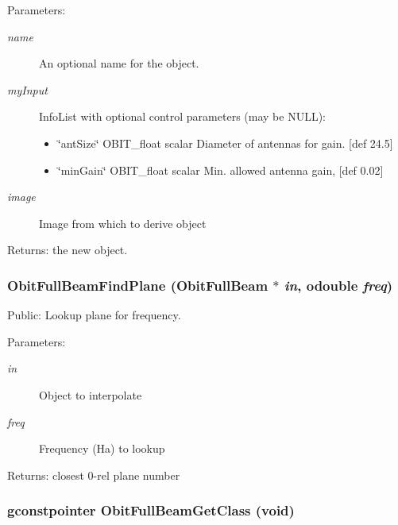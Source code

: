 \begin{Desc}
\item[Parameters:]
\begin{description}
\item[{\em name}]An optional name for the object. \item[{\em my\-Input}]Info\-List with optional control parameters (may be NULL): \begin{itemize}
\item \char`\"{}ant\-Size\char`\"{} OBIT\_\-float scalar Diameter of antennas for gain. [def 24.5] \item \char`\"{}min\-Gain\char`\"{} OBIT\_\-float scalar Min. allowed antenna gain, [def 0.02] \end{itemize}
\item[{\em image}]Image from which to derive object \end{description}
\end{Desc}
\begin{Desc}
\item[Returns:]the new object. \end{Desc}
\subsubsection{ Obit\-Full\-Beam\-Find\-Plane ({\bf Obit\-Full\-Beam} $\ast$ {\em in}, {\bf odouble} {\em freq})}\label{ObitFullBeam_8h_a16}


Public: Lookup plane for frequency. 

\begin{Desc}
\item[Parameters:]
\begin{description}
\item[{\em in}]Object to interpolate \item[{\em freq}]Frequency (Ha) to lookup \end{description}
\end{Desc}
\begin{Desc}
\item[Returns:]closest 0-rel plane number \end{Desc}
\subsubsection{\setlength{\rightskip}{0pt plus 5cm}gconstpointer Obit\-Full\-Beam\-Get\-Class (void)}\label{ObitFullBeam_8h_a10}


